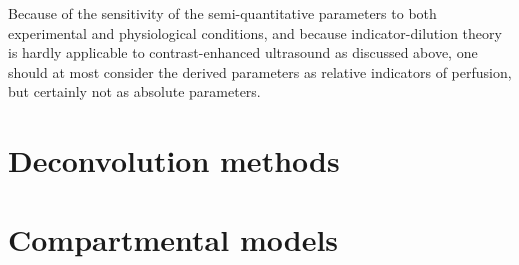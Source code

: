 Because of the sensitivity of the semi-quantitative parameters to both experimental and physiological conditions, and because indicator-dilution theory is hardly applicable to contrast-enhanced ultrasound as discussed above, one should at most consider the derived parameters as relative indicators of perfusion, but certainly not as absolute parameters.

\section{Deconvolution methods}
\label{sec:DeconvolutionMethods}
\section{Compartmental models}
\label{sec:CompartmentalModels}



